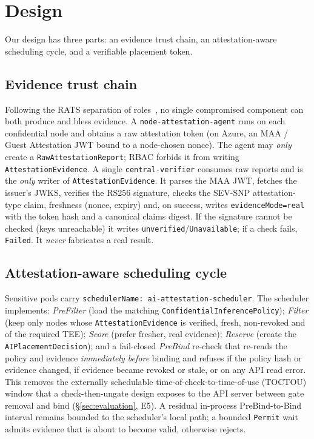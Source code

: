 \section{Design}
\label{sec:design}

Our design has three parts: an evidence trust chain, an attestation-aware
scheduling cycle, and a verifiable placement token.

\subsection{Evidence trust chain}
Following the RATS separation of roles~\cite{birkholz2023rats}, no single
compromised component can both produce and bless evidence. A
\texttt{node-attestation-agent} runs on each confidential node and obtains a raw
attestation token (on Azure, an MAA / Guest Attestation JWT bound to a
node-chosen nonce). The agent may \emph{only} create a
\texttt{RawAttestationReport}; RBAC forbids it from writing
\texttt{AttestationEvidence}. A single \texttt{central-verifier} consumes raw
reports and is the \emph{only} writer of \texttt{AttestationEvidence}. It parses
the MAA JWT, fetches the issuer's JWKS, verifies the RS256 signature, checks the
SEV-SNP attestation-type claim, freshness (nonce, expiry) and, on success, writes
\texttt{evidenceMode=real} with the token hash and a canonical claims digest.
If the signature cannot be checked (keys unreachable) it writes
\texttt{unverified}/\texttt{Unavailable}; if a check fails, \texttt{Failed}. It
\emph{never} fabricates a real result.

\subsection{Attestation-aware scheduling cycle}
Sensitive pods carry \texttt{schedulerName: ai-attestation-scheduler}. The
scheduler implements: \emph{PreFilter} (load the matching
\texttt{ConfidentialInferencePolicy}); \emph{Filter} (keep only nodes whose
\texttt{AttestationEvidence} is verified, fresh, non-revoked and of the required
TEE); \emph{Score} (prefer fresher, real evidence); \emph{Reserve} (create the
\texttt{AIPlacementDecision}); and a fail-closed \emph{PreBind} re-check that
re-reads the policy and evidence \emph{immediately before} binding and refuses if
the policy hash or evidence changed, if evidence became revoked or stale, or on
any API read error. This removes the externally schedulable
time-of-check-to-time-of-use (TOCTOU) window that a check-then-ungate design
exposes to the API server between gate removal and bind (\S\ref{sec:evaluation},
E5). A residual in-process PreBind-to-Bind
interval remains bounded to the scheduler's local path; a bounded
\texttt{Permit} wait admits evidence that is about to become valid, otherwise
rejects.

